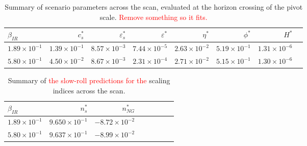 \begin{table}[h!]
  \begin{center}
    \begin{tabular}{lrrrrrrr}
        \toprule
        $\beta_{IR}$ &    $c_s^{*}$ &  $\varepsilon_s^{*}$ &   $\varepsilon^{*}$ &   $\eta^{*}$ &  $\phi^{*}$ &     $H^{*}$ \\
        \midrule
        $1.89\times 10^{-1}$  &  $1.39\times 10^{-1}$  &  $  8.57\times 10^{-3}$  &  $7.44\times 10^{-5}$  &  $2.63\times 10^{-2}$ &  $5.19\times 10^{-1}$  &  $1.31\times 10^{-6}$\\
        $5.80\times 10^{-1}$  &  $4.50\times 10^{-2}$  &  $  8.67\times 10^{-3}$  &  $2.31\times 10^{-4}$  &  $2.71\times 10^{-2}$ &  $5.15\times 10^{-1}$  &  $1.30\times 10^{-6}$\\
        \bottomrule
    \end{tabular}
    \caption{
        Summary of scenario parameters across the scan, evaluated at the horizon
      crossing of the pivot scale. \textcolor{red}{Remove something so it fits.}
      }\label{tab:scan_summary_sr}
  \end{center}
\end{table}




\begin{table}[h!]
  \begin{center}
    \begin{tabular}{lrrrrrrr}
        \toprule
        $\beta_{IR}$ &  $n_s^{*}$ &  $n_{NG}^{*}$\\
        \midrule
        $1.89\times 10^{-1}$  &  $9.650\times 10^{-1}$  &  $-8.72\times 10^{-2}$\\
        $5.80\times 10^{-1}$  &  $9.637\times 10^{-1}$  &  $-8.99\times 10^{-2}$\\
        \bottomrule
    \end{tabular}
      \caption{
          Summary of \textcolor{red}{the slow-roll predictions for the} scaling indices across the scan.
      }\label{tab:scan_summary_ns}
  \end{center}
\end{table}


